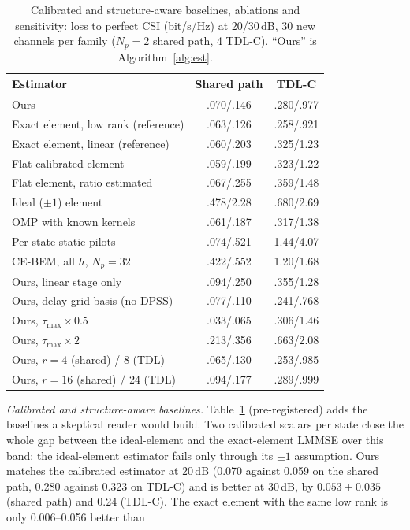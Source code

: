 \documentclass[conference,10pt]{IEEEtran}
\theoremstyle{remark}
\begin{document}
\begin{table}[t]\centering\footnotesize
\caption{Calibrated and structure-aware baselines, ablations and sensitivity: loss to perfect CSI (bit/s/Hz) at
20/30\,dB, 30 new channels per family ($N_p=2$ shared path, 4 TDL-C). ``Ours'' is Algorithm~\ref{alg:est}.}\label{tab:struct}
\setlength{\tabcolsep}{3pt}
\begin{tabular}{@{}lcc@{}}\toprule
Estimator & Shared path & TDL-C\\\midrule
Ours & .070/.146 & .280/.977\\
Exact element, low rank (reference) & .063/.126 & .258/.921\\
Exact element, linear (reference) & .060/.203 & .325/1.23\\
Flat-calibrated element & .059/.199 & .323/1.22\\
Flat element, ratio estimated & .067/.255 & .359/1.48\\
Ideal ($\pm1$) element & .478/2.28 & .680/2.69\\
OMP with known kernels & .061/.187 & .317/1.38\\
Per-state static pilots & .074/.521 & 1.44/4.07\\
CE-BEM, all $h$, $N_p=32$ & .422/.552 & 1.20/1.68\\\midrule
Ours, linear stage only & .094/.250 & .355/1.28\\
Ours, delay-grid basis (no DPSS) & .077/.110 & .241/.768\\
Ours, $\tau_{\max}\times0.5$ & .033/.065 & .306/1.46\\
Ours, $\tau_{\max}\times2$ & .213/.356 & .663/2.08\\
Ours, $r=4$ (shared) / 8 (TDL) & .065/.130 & .253/.985\\
Ours, $r=16$ (shared) / 24 (TDL) & .094/.177 & .289/.999\\\bottomrule
\end{tabular}
\end{table}
\emph{Calibrated and structure-aware baselines.} Table~\ref{tab:struct} (pre-registered) adds the baselines a skeptical
reader would build. Two calibrated scalars per state close the whole gap between the ideal-element and the exact-element
LMMSE over this band: the ideal-element estimator fails only through its $\pm1$ assumption. Ours matches the calibrated
estimator at 20\,dB (0.070 against 0.059 on the shared path, 0.280 against 0.323 on TDL-C) and is better at 30\,dB, by
$0.053\pm0.035$ (shared path) and 0.24 (TDL-C). The exact element with the same low rank is only 0.006--0.056 better than
\end{document}
